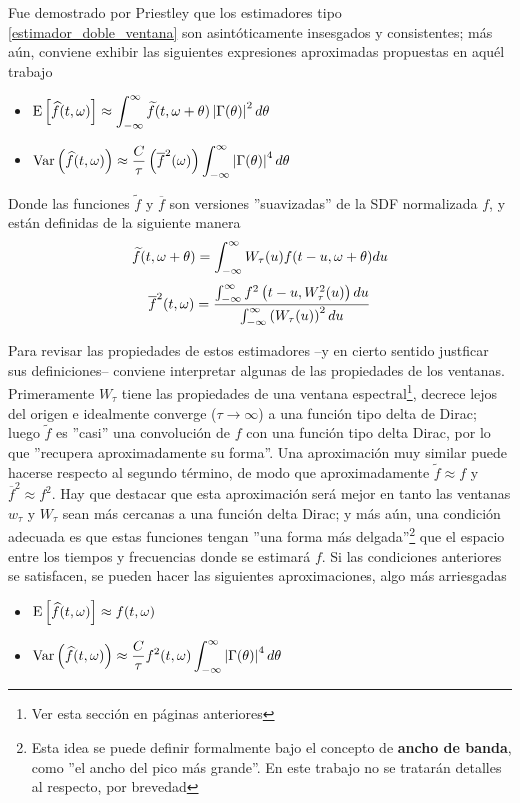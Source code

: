 Fue demostrado por Priestley \cite{Priestley65} que los estimadores tipo
\ref{estimador_doble_ventana} son asint\'oticamente insesgados y consistentes;
m\'as a\'un, conviene exhibir las siguientes expresiones aproximadas propuestas en aqu\'el trabajo
\begin{itemize}
\item $\displaystyle
\mathrm{E}\left[ \widehat{ f }(t,\omega) \right] \approx 
\int_{-\infty}^{\infty} \widetilde{f}(t,\omega+\theta) \left| \Gamma(\theta) \right|^{2} d\theta$
\item $\displaystyle
\mathrm{Var}\left( \widehat{ f }(t,\omega) \right) \approx \frac{C}{\tau} \left( \overline{f}^{2}(\omega) \right)
\int_{-\infty}^{\infty} \left| \Gamma(\theta) \right|^{4} d\theta $
\end{itemize}

Donde las funciones $\widetilde{f}$ y $\overline{f}$ son versiones ''suavizadas'' de la
SDF normalizada $f$, y est\'an definidas de la siguiente manera
\begin{equation*}
\widetilde{f}(t,\omega+\theta) = 
\int_{-\infty}^{\infty} W_{\tau}(u) f(t-u,\omega+\theta) du
\end{equation*}
\begin{equation*}
\overline{f}^{2} (t,\omega) =
\frac{\int_{-\infty}^{\infty} f^{2}\left(t-u,W_{\tau}^{2}(u)\right) du}
{\int_{-\infty}^{\infty} \left( W_{\tau}(u) \right)^{2} du}
\end{equation*}

Para revisar las propiedades de estos estimadores --y en cierto sentido justficar sus 
definiciones-- conviene interpretar algunas de las propiedades de los ventanas. 
Primeramente $W_{\tau}$ tiene las propiedades de una ventana espectral\footnote{Ver esta secci\'on
en p\'aginas anteriores},
decrece lejos del origen e idealmente converge ($\tau \rightarrow \infty$) 
a una funci\'on tipo delta de Dirac;
luego $\widetilde{f}$ es ''casi'' una convoluci\'on de $f$ con una funci\'on tipo delta Dirac, por
lo que ''recupera aproximadamente su forma''. Una aproximaci\'on muy similar puede hacerse
respecto al
segundo t\'ermino, de modo que aproximadamente $\widetilde{f}\approx f$ y 
$\overline{f}^{2}\approx f^{2}$. Hay que destacar que esta aproximaci\'on ser\'a mejor en 
tanto las ventanas $w_{\tau}$ y $W_{\tau}$ sean m\'as cercanas a una funci\'on delta Dirac; 
y m\'as a\'un, una condici\'on adecuada es que estas funciones tengan ''una forma m\'as 
delgada''\footnote{Esta idea se puede definir formalmente bajo el concepto de \textbf{ancho de 
banda}, como ''el ancho del pico m\'as grande''. En este trabajo no se tratar\'an detalles
al respecto, por brevedad}
que el espacio entre los tiempos y frecuencias donde se estimar\'a $f$.
Si las condiciones anteriores se satisfacen, se pueden hacer las siguientes aproximaciones, algo
m\'as arriesgadas
\begin{itemize}
\item $\displaystyle \mathrm{E}\left[ \widehat{ f }(t,\omega) \right] \approx f(t,\omega)$
\item $\displaystyle \mathrm{Var}\left( \widehat{ f }(t,\omega) \right) \approx 
\frac{C}{\tau} f^{2}(t,\omega) \int_{-\infty}^{\infty} \left| \Gamma (\theta) \right|^{4} d\theta$
\end{itemize}

